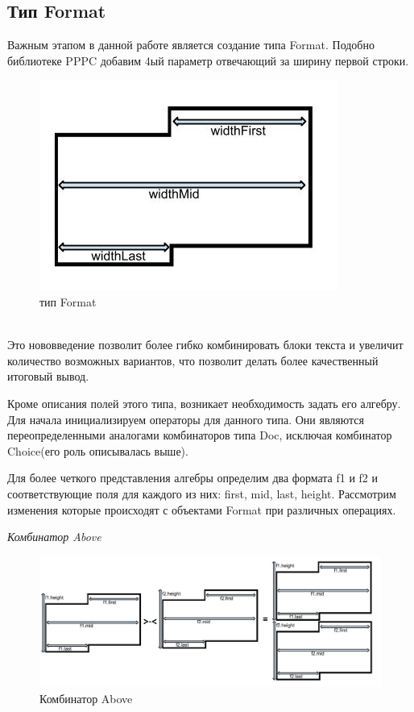 \documentclass{matmex-diploma}
\begin{document}
\subsection{Тип Format}
Важным этапом в данной работе является создание типа Format. Подобно библиотеке PPPC добавим 4ый параметр отвечающий за ширину первой строки.
\begin{figure}[h]
    \centering
	\includegraphics[scale=1.0]{Images/image03.png}
	\caption{тип Format}
\end{figure}
\\Это нововведение позволит более гибко комбинировать блоки текста и увеличит количество возможных вариантов, что позволит делать более качественный итоговый вывод. 

Кроме описания полей этого типа, возникает необходимость задать его алгебру. Для начала инициализируем операторы для данного типа. Они являются переопределенными аналогами комбинаторов типа Doc, исключая комбинатор Choice(его роль описывалась выше).

Для более четкого представления алгебры определим два формата f1 и f2 и соответствующие поля для каждого из них: first, mid, last, height. Рассмотрим изменения которые происходят с объектами Format при различных операциях.

\textit{Комбинатор Above}
\begin{figure}[h]
	\centering
	\includegraphics[scale=0.4]{Images/image02.png}
	\caption{Комбинатор Above}
\end{figure}
\end{document}
